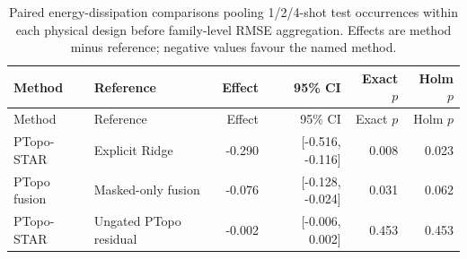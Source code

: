 \begin{longtable}{p{29mm}p{29mm}rrrr}
\caption{Paired energy-dissipation comparisons pooling 1/2/4-shot test occurrences within each physical design before family-level RMSE aggregation. Effects are method minus reference; negative values favour the named method.}\label{tab:s4_inference}\\
\toprule
Method & Reference & Effect & 95\% CI & Exact $p$ & Holm $p$ \\
\midrule
\endfirsthead
\toprule
Method & Reference & Effect & 95\% CI & Exact $p$ & Holm $p$ \\
\midrule
\endhead
PTopo-STAR & Explicit Ridge & -0.290 & [-0.516, -0.116] & 0.008 & 0.023 \\
PTopo fusion & Masked-only fusion & -0.076 & [-0.128, -0.024] & 0.031 & 0.062 \\
PTopo-STAR & Ungated PTopo residual & -0.002 & [-0.006, 0.002] & 0.453 & 0.453 \\
\bottomrule
\end{longtable}
